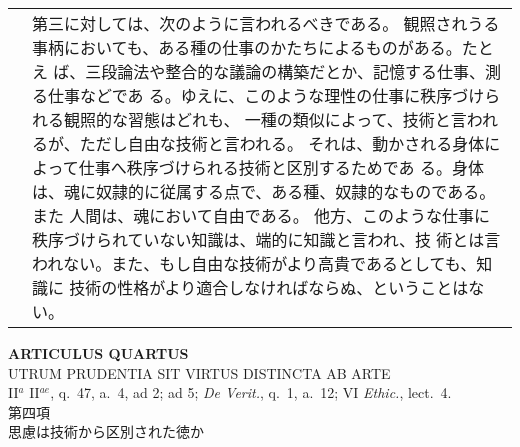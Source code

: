 \documentclass[10pt]{jsarticle} %
\begin{document}
\begin{longtable}{p{21em}p{21em}}
&
第三に対しては、次のように言われるべきである。
観照されうる事柄においても、ある種の仕事のかたちによるものがある。たとえ
 ば、三段論法や整合的な議論の構築だとか、記憶する仕事、測る仕事などであ
 る。ゆえに、このような理性の仕事に秩序づけられる観照的な習態はどれも、
 一種の類似によって、技術と言われるが、ただし自由な技術と言われる。
それは、動かされる身体によって仕事へ秩序づけられる技術と区別するためであ
 る。身体は、魂に奴隷的に従属する点で、ある種、奴隷的なものである。また
 人間は、魂において自由である。
他方、このような仕事に秩序づけられていない知識は、端的に知識と言われ、技
 術とは言われない。また、もし自由な技術がより高貴であるとしても、知識に
 技術の性格がより適合しなければならぬ、ということはない。





\end{longtable}
\newpage




\begin{center}
 {\Large {\bf ARTICULUS QUARTUS}}\\
 {\large UTRUM PRUDENTIA SIT VIRTUS DISTINCTA AB ARTE}\\
 {\footnotesize II$^a$ II$^{ae}$, q.~47, a.~4, ad 2; ad 5; {\itshape De
 Verit.}, q.~1, a.~12; VI {\itshape Ethic.}, lect.~4.}\\
 {\Large 第四項\\思慮は技術から区別された徳か}
\end{center}
\end{document}

